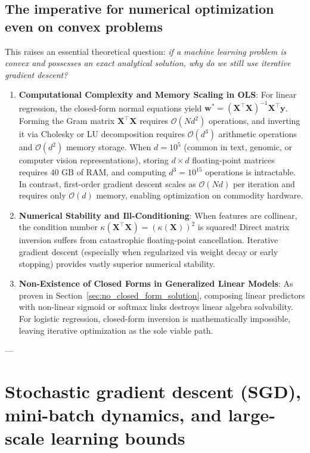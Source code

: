 \subsection{The imperative for numerical optimization even on convex problems}
\label{sec:convex_problems_numerical_optimization}

This raises an essential theoretical question: \emph{if a machine learning problem is convex and possesses an exact analytical solution, why do we still use iterative gradient descent?}

\begin{enumerate}
  \item \textbf{Computational Complexity and Memory Scaling in OLS}:
    For linear regression, the closed-form normal equations yield $\mathbf{w}^* = (\mathbf{X}^\top \mathbf{X})^{-1}\mathbf{X}^\top \mathbf{y}$. 
    Forming the Gram matrix $\mathbf{X}^\top \mathbf{X}$ requires $\mathcal{O}(N d^2)$ operations, and inverting it via Cholesky or LU decomposition requires $\mathcal{O}(d^3)$ arithmetic operations and $\mathcal{O}(d^2)$ memory storage.
    When $d = 10^5$ (common in text, genomic, or computer vision representations), storing $d \times d$ floating-point matrices requires $40\text{ GB}$ of RAM, and computing $d^3 = 10^{15}$ operations is intractable.
    In contrast, first-order gradient descent scales as $\mathcal{O}(Nd)$ per iteration and requires only $\mathcal{O}(d)$ memory, enabling optimization on commodity hardware.
  \item \textbf{Numerical Stability and Ill-Conditioning}:
    When features are collinear, the condition number $\kappa(\mathbf{X}^\top \mathbf{X}) = (\kappa(\mathbf{X}))^2$ is squared! Direct matrix inversion suffers from catastrophic floating-point cancellation. Iterative gradient descent (especially when regularized via weight decay or early stopping) provides vastly superior numerical stability.
  \item \textbf{Non-Existence of Closed Forms in Generalized Linear Models}:
    As proven in Section~\ref{sec:no_closed_form_solution}, composing linear predictors with non-linear sigmoid or softmax links destroys linear algebra solvability. For logistic regression, closed-form inversion is mathematically impossible, leaving iterative optimization as the sole viable path.
\end{enumerate}

---

\section{Stochastic gradient descent (SGD), mini-batch dynamics, and large-scale learning bounds}
\label{sec:sgd_and_minibatch}

